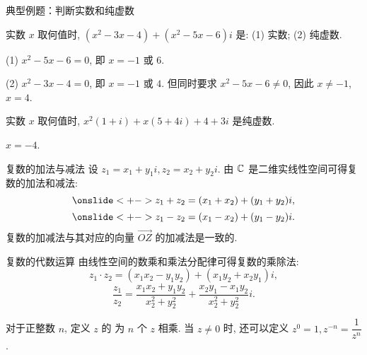 \begin{frame}{典型例题：判断实数和纯虚数}
\begin{example}
实数 $x$ 取何值时, $(x^2-3x-4)+(x^2-5x-6)i$ 是: (1) 实数; (2) 纯虚数.
\end{example}
\begin{solution}
(1) $x^2-5x-6=0$, 即 $x=-1$ 或 $6$.

\onslide<+->
(2) $x^2-3x-4=0$, 即 $x=-1$ 或 $4$.
\onslide<+->
但同时要求 $x^2-5x-6\neq 0$, 因此 $x\neq -1$, $x=4$.
\end{solution}

\begin{exercise}
实数 $x$ 取何值时, $x^2(1+i)+x(5+4i)+4+3i$ 是纯虚数.
\end{exercise}
\begin{answer}
$x=-4$.
\end{answer}
\end{frame}


\begin{frame}{复数的加法与减法}
\onslide<+->
设 $z_1=x_1+y_1i,z_2=x_2+y_2i$.
\onslide<+->
由 ${\mathbb{C}}$ 是二维实线性空间可得复数的加法和减法:
\[\onslide<+->{z_1+z_2=(x_1+x_2)+(y_1+y_2)i,}\]
\vspace{-\baselineskip}
\[\onslide<+->{z_1-z_2=(x_1-x_2)+(y_1-y_2)i.}\]
\vspace{-\baselineskip}
\onslide<+->
复数的加减法与其对应的向量 $\overrightarrow{OZ}$ 的加减法是一致的.

\onslide<+->
\vspace{10pt}
\begin{center}
\end{center}
\end{frame}


\begin{frame}{复数的代数运算}
\onslide<+->
\onslide<+->
由线性空间的数乘和乘法分配律可得复数的乘除法:
\onslide<+->
\[z_1\cdot z_2=(x_1x_2-y_1y_2)+(x_1y_2+x_2y_1)i,\]
\onslide<+->
\vspace{-\baselineskip}
\[\frac{z_1}{z_2}=\frac{x_1x_2+y_1y_2}{x_2^2+y_2^2}+\frac{x_2y_1-x_1y_2}{x_2^2+y_2^2}i.\]

\onslide<+->
对于正整数 $n$, 定义 $z$ 的 为 $n$ 个 $z$ 相乘.
\onslide<+->
当 $z\neq 0$ 时, 还可以定义 $z^0=1,z^{-n}=\dfrac1{z^n}$.
\end{frame}


